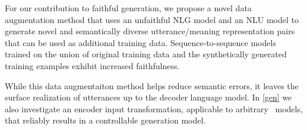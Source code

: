 %
%
%


For our contribution to faithful generation, we propose a novel 
data augmentation method that uses an unfaithful NLG model and an NLU model 
to generate novel and semantically diverse utterance/meaning representation 
pairs that can be used as additional training data. Sequence-to-sequence
models trained on the union of original training data and the synthetically
generated training examples exhibit increased faithfulness.


While this data augmentaiton method helps reduce semantic errors, it leaves the surface
realization of utterances up to the decoder language model. In \autoref{gen}
we also investigate an encoder input transformation, applicable to arbitrary \sequencetosequence~models, that reliably results in a controllable generation 
model. 


%
%
%
%


